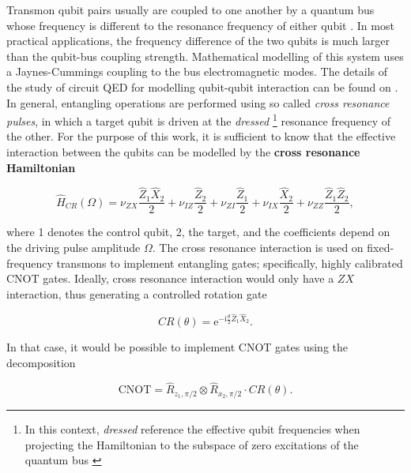     Transmon qubit pairs usually are coupled to one another by a quantum bus whose frequency is different to the resonance frequency of either qubit \cite{quantumEngineer, 2016RZXCalibration}. In most practical applications, the frequency difference of the two qubits is much larger than the qubit-bus coupling strength. Mathematical modelling of this system uses a Jaynes-Cummings coupling to the bus electromagnetic modes. The details of the study of circuit QED for modelling qubit-qubit interaction can be found on \cite{2020RZXHamiltonianModels}. In general, entangling operations are performed using so called \textit{cross resonance pulses}, in which a target qubit is driven at the \textit{dressed} \footnote{In this context, \textit{dressed} reference the effective qubit frequencies when projecting the Hamiltonian to the subspace of zero excitations of the quantum bus \cite{2020RZXHamiltonianModels}} resonance frequency of the other. For the purpose of this work, it is sufficient to know that the effective interaction between the qubits can be modelled by the \textbf{cross resonance Hamiltonian} \cite{DuplicatedRXZPulse, 2016RZXCalibration}

    \begin{equation}
      \hat{H}_{CR}(\Omega) = \nu_{ZX} \frac{\hat{Z}_1\hat{X}_2}{2} + \nu_{IZ} \frac{\hat{Z}_2}{2} + \nu_{ZI} \frac{\hat{Z}_1}{2} + \nu_{IX} \frac{\hat{X}_2}{2} + \nu_{ZZ} \frac{\hat{Z}_1\hat{Z}_2}{2},
      \label{eq:CRHamiltonian}
    \end{equation}

    \noindent where 1 denotes the control qubit, 2, the target, and the coefficients depend on the driving pulse amplitude $\Omega$. The cross resonance interaction is used on fixed-frequency transmons to implement entangling gates; specifically, highly calibrated CNOT gates. Ideally, cross resonance interaction would only have a $ZX$ interaction, thus generating a controlled rotation gate

    \begin{equation}
      CR(\theta) = \mathrm{e}^{-\mathrm{i}\frac{\theta}{2}\hat{Z}_1\hat{X}_2}.
    \end{equation}

    \noindent In that case, it would be possible to implement CNOT gates using the decomposition \cite{quantumEngineer}

    \begin{equation}
      \text{CNOT} = \hat{R}_{z_1, \pi/2} \otimes \hat{R}_{x_2, \pi/2} \cdot CR(\theta).
    \end{equation}

